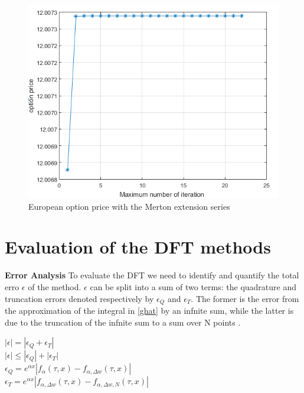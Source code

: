 \documentclass[12pt]{report}
\begin{document}
\begin{figure}[H]
\centering
\includegraphics{maxiteration.png} 
\caption{ European option price with the Merton extension series}
\end{figure}


\section{Evaluation of the DFT methods }
\textbf{Error Analysis }
To evaluate the DFT we need to identify and quantify the total erro $\epsilon$ of the method.
 $\epsilon$ can be split into a sum of two terms: the quadrature and truncation errors denoted respectively by $\epsilon_Q$ and $\epsilon_T$. The former is the error from the approximation of the integral in \eqref{ghat} by an infnite sum, while the latter is due to the truncation of the infnite sum to a sum over N points .\\
\begin{center}
$|\epsilon|=|\epsilon_Q+\epsilon_T|$\\
$|\epsilon| \leq |\epsilon_Q|+|\epsilon_T|$\\
$\epsilon_Q=e^{\alpha x }|f_{\alpha}(\tau,x)-f_{\alpha,\Delta w }(\tau,x)|$\\
$\epsilon_T=e^{\alpha x }|f_{\alpha,\Delta w }(\tau,x)-f_{\alpha,\Delta w, N }(\tau,x)|$
\end{center}
\end{document}
